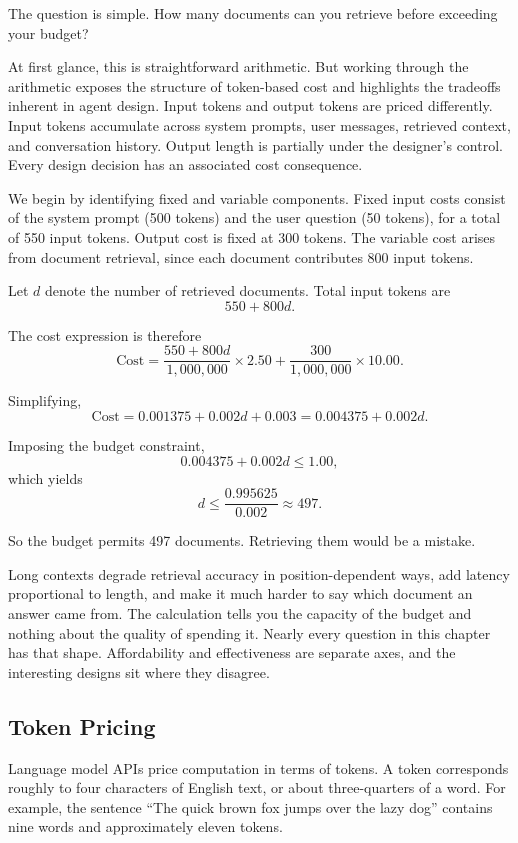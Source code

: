 The question is simple. How many documents can you retrieve before exceeding your budget?

At first glance, this is straightforward arithmetic. But working through the arithmetic exposes the structure of token-based cost and highlights the tradeoffs inherent in agent design. Input tokens and output tokens are priced differently. Input tokens accumulate across system prompts, user messages, retrieved context, and conversation history. Output length is partially under the designer’s control. Every design decision has an associated cost consequence.

We begin by identifying fixed and variable components. Fixed input costs consist of the system prompt (500 tokens) and the user question (50 tokens), for a total of 550 input tokens. Output cost is fixed at 300 tokens. The variable cost arises from document retrieval, since each document contributes 800 input tokens.

Let $d$ denote the number of retrieved documents. Total input tokens are
\[
550 + 800d.
\]

The cost expression is therefore
\[
\text{Cost} = \frac{550 + 800d}{1{,}000{,}000} \times 2.50
             + \frac{300}{1{,}000{,}000} \times 10.00.
\]

Simplifying,
\[
\text{Cost} = 0.001375 + 0.002d + 0.003
            = 0.004375 + 0.002d.
\]

Imposing the budget constraint,
\[
0.004375 + 0.002d \leq 1.00,
\]
which yields
\[
d \leq \frac{0.995625}{0.002} \approx 497.
\]

So the budget permits 497 documents. Retrieving them would be a mistake.

Long contexts degrade retrieval accuracy in position-dependent ways, add latency proportional to length, and make it much harder to say which document an answer came from. The calculation tells you the capacity of the budget and nothing about the quality of spending it. Nearly every question in this chapter has that shape. Affordability and effectiveness are separate axes, and the interesting designs sit where they disagree.

\subsection{Token Pricing}

Language model APIs price computation in terms of tokens. A token corresponds roughly to four characters of English text, or about three-quarters of a word. For example, the sentence “The quick brown fox jumps over the lazy dog” contains nine words and approximately eleven tokens.

